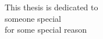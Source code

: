 \documentclass[thesis-main]{subfiles}
\begin{document}
\begin{dedication}
This thesis is dedicated to\\
 someone special\\
for some special reason\\
\end{dedication}
\end{document}
